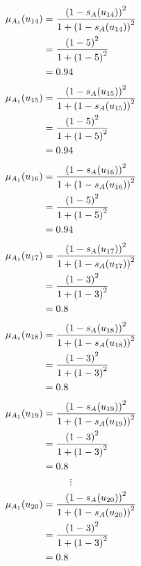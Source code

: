 \documentclass[a4paper,openany]{book}
\begin{document}
				\begin{align}
					\mu_{A_1}(u_{14}) &= \frac{\left(1-s_A(u_{14})\right)^2}{1 + \left(1-s_A(u_{14})\right)^2}\\
					&= \frac{\left(1-5\right)^2}{1 + \left(1-5\right)^2} \notag \\
					&= 0.94 \notag
				\end{align}
				\begin{align}
					\mu_{A_1}(u_{15}) &= \frac{\left(1-s_A(u_{15})\right)^2}{1 + \left(1-s_A(u_{15})\right)^2}\\
					&= \frac{\left(1-5\right)^2}{1 + \left(1-5\right)^2} \notag \\
					&= 0.94 \notag
				\end{align}
				\begin{align}
					\mu_{A_1}(u_{16}) &= \frac{\left(1-s_A(u_{16})\right)^2}{1 + \left(1-s_A(u_{16})\right)^2}\\
					&= \frac{\left(1-5\right)^2}{1 + \left(1-5\right)^2} \notag \\
					&= 0.94 \notag
				\end{align}
				\begin{align}
					\mu_{A_1}(u_{17}) &= \frac{\left(1-s_A(u_{17})\right)^2}{1 + \left(1-s_A(u_{17})\right)^2}\\
					&= \frac{\left(1-3\right)^2}{1 + \left(1-3\right)^2} \notag \\
					&= 0.8 \notag
				\end{align}
				\begin{align}
					\mu_{A_1}(u_{18}) &= \frac{\left(1-s_A(u_{18})\right)^2}{1 + \left(1-s_A(u_{18})\right)^2}\\
					&= \frac{\left(1-3\right)^2}{1 + \left(1-3\right)^2} \notag \\
					&= 0.8 \notag
				\end{align}
				\begin{align}
					\mu_{A_1}(u_{19}) &= \frac{\left(1-s_A(u_{19})\right)^2}{1 + \left(1-s_A(u_{19})\right)^2}\\
					&= \frac{\left(1-3\right)^2}{1 + \left(1-3\right)^2} \notag \\
					&= 0.8 \notag
				\end{align}
				\[
					\vdots
				\]
				\begin{align}
					\mu_{A_1}(u_{20}) &= \frac{\left(1-s_A(u_{20})\right)^2}{1 + \left(1-s_A(u_{20})\right)^2}\\
					&= \frac{\left(1-3\right)^2}{1 + \left(1-3\right)^2} \notag \\
					&= 0.8 \notag
				\end{align}
\end{document}
